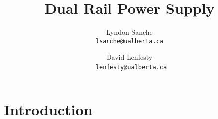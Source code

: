 \documentclass{article}
\title{Dual Rail Power Supply}
\author{
    Lyndon Sanche\\
    \texttt{lsanche@ualberta.ca}
    \and
    David Lenfesty\\\
    \texttt{lenfesty@ualberta.ca}
}
\begin{document}
\maketitle
\newpage
\tableofcontents

\section{Introduction}
\end{document}

